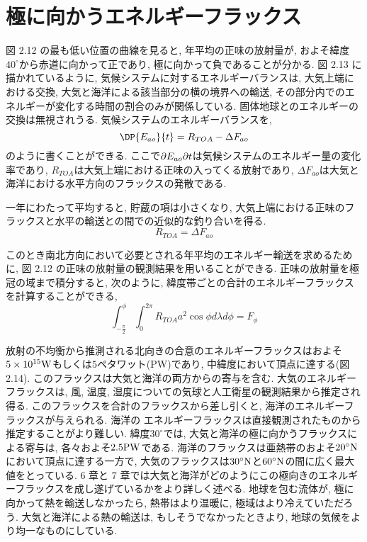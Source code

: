 \documentclass[a4j,12pt,openbib,oneside,dvipdfmx]{jbook}
\begin{document}
\newpage
{}
\section{極に向かうエネルギーフラックス}
図 2.12 の最も低い位置の曲線を見ると, 年平均の正味の放射量が, およそ緯度$40^\circ$から赤道に向かって正であり, 極に向かって負であることが分かる.
図 2.13 に描かれているように, 気候システムに対するエネルギーバランスは, 大気上端における交換, 大気と海洋による該当部分の横の境界への輸送, その部分内でのエネルギーが変化する時間の割合のみが関係している.
固体地球とのエネルギーの交換は無視されうる.
気候システムのエネルギーバランスを,
\begin{equation}
  \DP{E_{ao}}{t}=R_{TOA}-\Delta{F_{ao}}
\end{equation}
のように書くことができる. 
ここで$\partial E_{ao}\/\partial t$は気候システムのエネルギー量の変化率であり, $R_{TOA}$は大気上端における正味の入ってくる放射であり, $\Delta{F_{ao}}$は大気と海洋における水平方向のフラックスの発散である.
\par
一年にわたって平均すると, 貯蔵の項は小さくなり, 大気上端における正味のフラックスと水平の輸送との間での近似的な釣り合いを得る.
\begin{equation}
  R_{TOA}=\Delta{F_{ao}}
\end{equation}
\par
このとき南北方向において必要とされる年平均のエネルギー輸送を求めるために, 図 2.12 の正味の放射量の観測結果を用いることができる. 
正味の放射量を極冠の域まで積分すると, 次のように, 緯度帯ごとの合計のエネルギーフラックスを計算することができる,
\begin{equation}
  \int_{-\frac{\pi}{2}}^\phi \int_0^{2\pi} R_{TOA}a^2\cos{\phi}d{\lambda}d{\phi}=F_{\phi}
\end{equation}
\par
放射の不均衡から推測される北向きの合意のエネルギーフラックスはおよそ$5\times10^{15}\rm{W}$もしくは$5$ペタワット(PW)であり, 中緯度において頂点に達する(図 2.14).
このフラックスは大気と海洋の両方からの寄与を含む.
大気のエネルギーフラックスは, 風, 温度, 湿度についての気球と人工衛星の観測結果から推定され得る. 
このフラックスを合計のフラックスから差し引くと, 海洋のエネルギーフラックスが与えられる. 
海洋の エネルギーフラックスは直接観測されたものから推定することがより難しい.
緯度$30^\circ$では, 大気と海洋の極に向かうフラックスによる寄与は, 各々およそ$2.5\rm{PW}$である.
海洋のフラックスは亜熱帯のおよそ$20^\circ\rm{N}$において頂点に達する一方で, 大気のフラックスは$30^\circ\rm{N}$と$60^\circ\rm{N}$の間に広く最大値をとっている.
6 章と 7 章では大気と海洋がどのようにこの極向きのエネルギーフラックスを成し遂げているかをより詳しく述べる.
地球を包む流体が, 極に向かって熱を輸送しなかったら, 熱帯はより温暖に, 極域はより冷えていただろう.
大気と海洋による熱の輸送は, もしそうでなかったときより, 地球の気候をより均一なものにしている.
\end{document}
